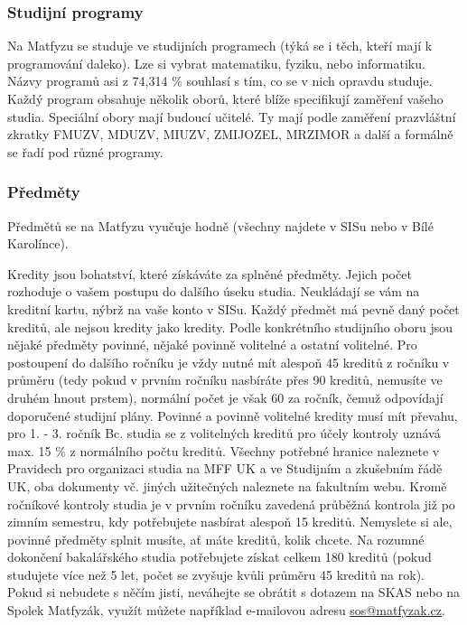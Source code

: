 \subsubsection{Studijní programy}
Na Matfyzu se studuje ve studijních programech (týká se i těch, kteří mají k
programování daleko). Lze si vybrat matematiku, fyziku, nebo informatiku. Názvy
programů asi z 74,314 \% souhlasí s tím, co se v nich opravdu studuje. Každý
program obsahuje několik oborů, které blíže specifikují zaměření vašeho studia.
Speciální obory mají budoucí učitelé. Ty mají podle zaměření prazvláštní zkratky
FMUZV, MDUZV, MIUZV, ZMIJOZEL, MRZIMOR a další a formálně se řadí pod různé
programy.


\subsubsection{Předměty}
Předmětů se na Matfyzu vyučuje hodně (všechny najdete v SISu nebo v Bílé
Karolínce).

Kredity jsou bohatství, které získáváte za splněné předměty. Jejich počet
rozhoduje o vašem postupu do dalšího úseku studia. Neukládají se vám na kreditní
kartu, nýbrž na vaše konto v SISu.
Každý předmět má pevně daný počet kreditů, ale nejsou kredity jako kredity.
Podle konkrétního studijního oboru jsou nějaké předměty povinné, nějaké povinně
volitelné a ostatní volitelné.
Pro postoupení do dalšího ročníku je vždy nutné mít alespoň 45 kreditů z ročníku
v průměru (tedy pokud v prvním ročníku nasbíráte přes 90 kreditů, nemusíte ve
druhém hnout prstem), normální počet je však 60 za ročník, čemuž odpovídají
doporučené studijní plány. Povinné a povinně volitelné kredity musí mít převahu,
pro 1. - 3. ročník Bc. studia se z volitelných kreditů pro účely kontroly uznává
max. 15 \% z normálního počtu kreditů. Všechny potřebné hranice naleznete v
Pravidech pro organizaci studia na MFF UK a ve Studijním a zkušebním řádě UK,
oba dokumenty vč. jiných užitečných naleznete na fakultním webu. Kromě ročníkové
kontroly studia je v prvním ročníku zavedená průběžná kontrola již po zimním
semestru, kdy potřebujete nasbírat alespoň 15 kreditů. Nemyslete si ale, povinné
předměty splnit musíte, ať máte kreditů, kolik chcete.
Na rozumné dokončení bakalářského studia potřebujete získat celkem 180 kreditů
(pokud studujete více než 5 let, počet se zvyšuje kvůli průměru 45 kreditů na
rok).
Pokud si nebudete s něčím jisti, neváhejte se obrátit s dotazem na SKAS nebo na
Spolek Matfyzák, využít můžete například e-mailovou adresu
\url{sos@matfyzak.cz}.

